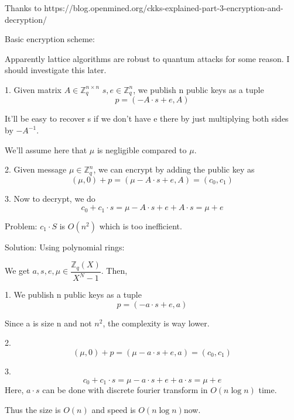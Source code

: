 \documentclass{article}
\begin{document}
	Thanks to https://blog.openmined.org/ckks-explained-part-3-encryption-and-decryption/
	
	Basic encryption scheme:
	
	Apparently lattice algorithms are robust to quantum attacks for some reason. I should investigate this later.
	
	1. Given matrix $A \in \mathbb{Z}^{n \times n}_q$ $s, e \in \mathbb{Z}^n_q$, we publish n public keys as a tuple
	\begin{equation}
		p=(-A \cdot s + e, A)
	\end{equation}
	
	It'll be easy to recover s if we don't have e there by just multiplying both sides by $-A^{-1}$.
	
	We'll assume here that $\mu$ is negligible compared to $\mu$.
	
	2. Given message $\mu \in \mathbb{Z}^n_q$, we can encrypt by adding the public key as
	\begin{equation}
		(\mu, 0) + p=(\mu -A \cdot s + e, A) = (c_0, c_1)
	\end{equation}
	
	3. Now to decrypt, we do
	\begin{equation}
		c_0+c_1\cdot s = \mu -A \cdot s + e + A \cdot s = \mu + e
	\end{equation}
	
	Problem: $c_1 \cdot S$ is $O(n^2)$ which is too inefficient.
	
	Solution: Using polynomial rings:
	
	We get $a, s, e, \mu \in \dfrac{\mathbb{Z}_q(X)}{X^N-1}$. Then,
	
	1. We publish n public keys as a tuple
	\begin{equation}
		p=(-a \cdot s + e, a)
	\end{equation}

	Since a is size n and not $n^2$, the complexity is way lower.
	
	2. 
	\begin{equation}
		(\mu, 0) + p=(\mu -a \cdot s + e, a) = (c_0, c_1)
	\end{equation}

	3.
	\begin{equation}
		c_0+c_1\cdot s = \mu -a \cdot s + e + a \cdot s = \mu + e
	\end{equation}
	Here, $a \cdot s$ can be done with discrete fourier transform in $O(n\log n)$ time.
	
	Thus the size is $O(n)$ and speed is $O(n\log n) $now.
	
\end{document}
